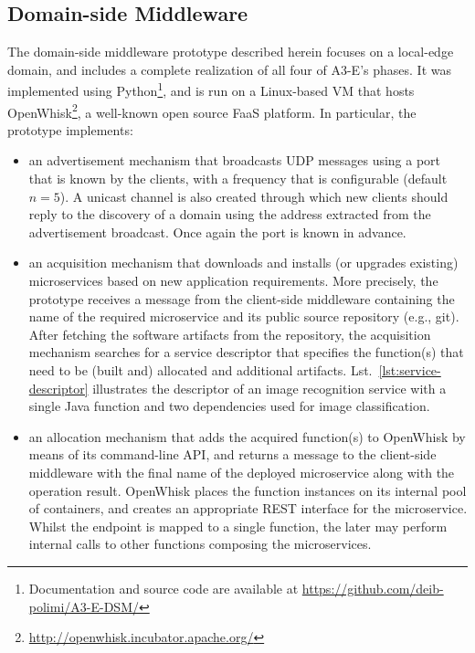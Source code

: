 \subsection{Domain-side Middleware}


The domain-side middleware prototype described herein focuses on a local-edge domain, and includes a complete realization of all four of A3-E's phases. It was implemented using Python\footnote{Documentation and source code are available at \url{https://github.com/deib-polimi/A3-E-DSM/}}, and is run on a Linux-based VM that hosts OpenWhisk\footnote{\url{http://openwhisk.incubator.apache.org/}}, a well-known open source FaaS platform. In particular, the prototype implements:

\begin{itemize}

	\item an advertisement mechanism that broadcasts UDP messages using a port that is known by the clients, with a frequency that is configurable (default $n=5$). A unicast channel is also created through which new clients should reply to the discovery of a domain using the address extracted from the advertisement broadcast. Once again the port is known in advance.

	\item an acquisition mechanism that downloads and installs (or upgrades existing) microservices based on new application requirements. More precisely, the prototype receives a message from the client-side middleware containing the name of the required microservice and its public source repository (e.g., git). After fetching the software artifacts from the repository, the acquisition mechanism searches for a service descriptor that specifies the function(s) that need to be (built and) allocated and additional artifacts. Lst.~\ref{lst:service-descriptor} illustrates the descriptor of an image recognition service with a single Java function and two dependencies used for image classification.

	\item an allocation mechanism that adds the acquired function(s) to OpenWhisk by means of its command-line API, and returns a message to the client-side middleware with the final name of the deployed microservice along with the operation result. OpenWhisk places the function instances on its internal pool of containers, and creates an appropriate REST interface for the microservice. Whilst the endpoint is mapped to a single function, the later may perform internal calls to other functions composing the microservices.

\end{itemize}

